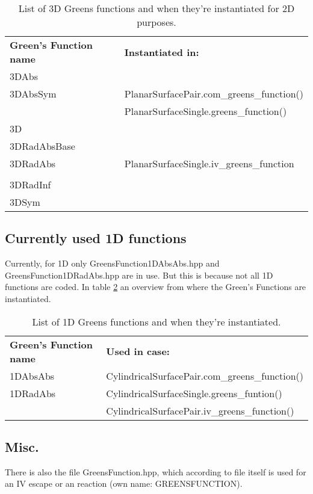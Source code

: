 \documentclass[a4paper,10pt]{article}
\begin{document}
\begin{table}[h!]
\caption{List of 3D Greens functions and when they're instantiated for 2D purposes.}
\label{3Dtablesubstinst}
\begin{tabular}{ p{} p{} }
  \textbf{Green's Function name} & \textbf{Instantiated in:} \\
3DAbs 		& \\
3DAbsSym 	& PlanarSurfacePair.com\_greens\_function()\\
		& PlanarSurfaceSingle.greens\_function()\\
3D 		& \\
3DRadAbsBase 	& \\
3DRadAbs	& PlanarSurfaceSingle.iv\_greens\_function\\
		& \\
3DRadInf 	& \\
3DSym 		& \\
\end{tabular}
\end{table}
 
\subsection{Currently used 1D functions}

Currently, for 1D only GreensFunction1DAbsAbs.hpp and GreensFunction1DRadAbs.hpp are in use. But this is because not all 1D functions are coded. In table \ref{1Dtableinst} an overview from where the Green's Functions are instantiated.

\begin{table}[h!]
\caption{List of 1D Greens functions and when they're instantiated.}
\label{1Dtableinst}
\begin{tabular}{ p{} p{} }
  \textbf{Green's Function name} & \textbf{Used in case:} \\
1DAbsAbs	& CylindricalSurfacePair.com\_greens\_function()\\
1DRadAbs 	& CylindricalSurfaceSingle.greens\_funtion()\\
		& CylindricalSurfacePair.iv\_greens\_function()
\end{tabular}
\end{table}

\subsection{Misc.}

There is also the file GreensFunction.hpp, which according to file itself is used for an IV escape or an reaction (own name: GREENSFUNCTION).
\end{document}

